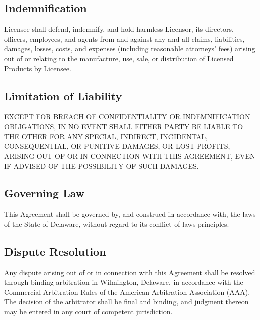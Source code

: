 \subsection{Indemnification} Licensee shall defend, indemnify, and hold harmless Licensor, its directors, officers, employees, and agents from and against any and all claims, liabilities, damages, losses, costs, and expenses (including reasonable attorneys' fees) arising out of or relating to the manufacture, use, sale, or distribution of Licensed Products by Licensee.

\subsection{Limitation of Liability} EXCEPT FOR BREACH OF CONFIDENTIALITY OR INDEMNIFICATION OBLIGATIONS, IN NO EVENT SHALL EITHER PARTY BE LIABLE TO THE OTHER FOR ANY SPECIAL, INDIRECT, INCIDENTAL, CONSEQUENTIAL, OR PUNITIVE DAMAGES, OR LOST PROFITS, ARISING OUT OF OR IN CONNECTION WITH THIS AGREEMENT, EVEN IF ADVISED OF THE POSSIBILITY OF SUCH DAMAGES.

\subsection{Governing Law} This Agreement shall be governed by, and construed in accordance with, the laws of the State of Delaware, without regard to its conflict of laws principles.

\subsection{Dispute Resolution} Any dispute arising out of or in connection with this Agreement shall be resolved through binding arbitration in Wilmington, Delaware, in accordance with the Commercial Arbitration Rules of the American Arbitration Association (AAA). The decision of the arbitrator shall be final and binding, and judgment thereon may be entered in any court of competent jurisdiction.
